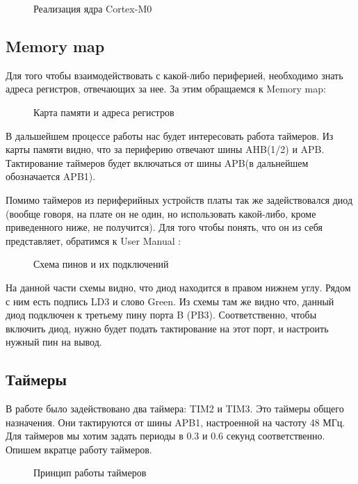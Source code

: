 \begin{figure}[H]
    \caption{Реализация ядра Cortex-M0}
\end{figure}

\subsection{Memory map}
Для того чтобы взаимодействовать с какой-либо периферией, необходимо знать адреса регистров, отвечающих за нее. За этим
обращаемся к Memory map:

\begin{figure}[H]
    \caption{Карта памяти и адреса регистров}
\end{figure}

В дальшейшем процессе работы нас будет интересовать работа таймеров. Из карты памяти видно, что за периферию отвечают шины 
AHB(1/2) и APB. Тактирование таймеров будет включаться от шины APB(в дальнейшем обозначается APB1).

Помимо таймеров из периферийных устройств платы так же задействовался диод (вообще говоря, на плате он не один, но
использовать какой-либо, кроме приведенного ниже, не получится). Для того чтобы понять, что он из себя представляет, обратимся
к User Manual \cite{user}:

\begin{figure}[H]
    \caption{Схема пинов и их подключений}
\end{figure}

На данной части схемы видно, что диод находится в правом нижнем углу. Рядом с ним есть подпись LD3 и слово Green. 
Из схемы там же видно что, данный диод подключен к третьему пину порта B (PB3). Соответственно, чтобы включить диод,
нужно будет подать тактирование на этот порт, и настроить нужный пин на вывод.

\subsection{Таймеры}
В работе было задействовано два таймера: TIM2 и TIM3. Это таймеры общего назначения. Они тактируются от шины APB1, 
настроенной на частоту 48 МГц. Для таймеров мы хотим задать периоды в $0.3$ и $0.6$ секунд соответственно.
Опишем вкратце работу таймеров.

\begin{figure}[H]
    \caption{Принцип работы таймеров}
\end{figure}

